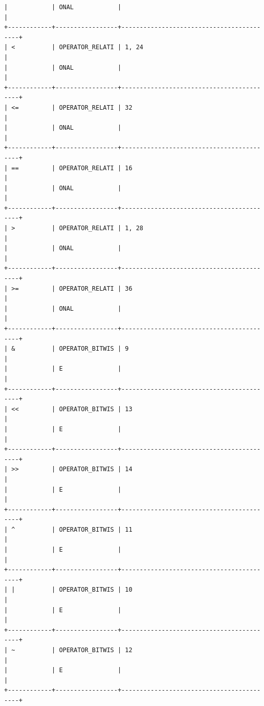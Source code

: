 \documentclass[a4paper,12pt]{article}
\begin{document}
\begin{flushleft}
\begin{verbatim}
|            | ONAL            |                                          |
+------------+-----------------+------------------------------------------+
| <          | OPERATOR_RELATI | 1, 24                                    |
|            | ONAL            |                                          |
+------------+-----------------+------------------------------------------+
| <=         | OPERATOR_RELATI | 32                                       |
|            | ONAL            |                                          |
+------------+-----------------+------------------------------------------+
| ==         | OPERATOR_RELATI | 16                                       |
|            | ONAL            |                                          |
+------------+-----------------+------------------------------------------+
| >          | OPERATOR_RELATI | 1, 28                                    |
|            | ONAL            |                                          |
+------------+-----------------+------------------------------------------+
| >=         | OPERATOR_RELATI | 36                                       |
|            | ONAL            |                                          |
+------------+-----------------+------------------------------------------+
| &          | OPERATOR_BITWIS | 9                                        |
|            | E               |                                          |
+------------+-----------------+------------------------------------------+
| <<         | OPERATOR_BITWIS | 13                                       |
|            | E               |                                          |
+------------+-----------------+------------------------------------------+
| >>         | OPERATOR_BITWIS | 14                                       |
|            | E               |                                          |
+------------+-----------------+------------------------------------------+
| ^          | OPERATOR_BITWIS | 11                                       |
|            | E               |                                          |
+------------+-----------------+------------------------------------------+
| |          | OPERATOR_BITWIS | 10                                       |
|            | E               |                                          |
+------------+-----------------+------------------------------------------+
| ~          | OPERATOR_BITWIS | 12                                       |
|            | E               |                                          |
+------------+-----------------+------------------------------------------+

\end{verbatim}
\end{flushleft}
\end{document}
